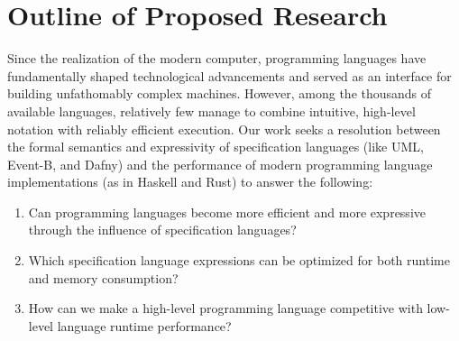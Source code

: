 \documentclass[12pt]{article}
\begin{document}
\section{Outline of Proposed Research}



Since the realization of the modern computer, programming languages have fundamentally shaped technological advancements and served as an interface for building unfathomably complex machines. However, among the thousands of available languages, relatively few manage to combine intuitive, high-level notation with reliably efficient execution. Our work seeks a resolution between the formal semantics and expressivity of specification languages (like UML, Event-B, and Dafny) and the performance of modern programming language implementations (as in Haskell and Rust) to answer the following:
\begin{enumerate}
  \item Can programming languages become more efficient and more expressive through the influence of specification languages?
  \item Which specification language expressions can be optimized for both runtime and memory consumption?
  \item How can we make a high-level programming language competitive with low-level language runtime performance?
\end{enumerate}
\end{document}
